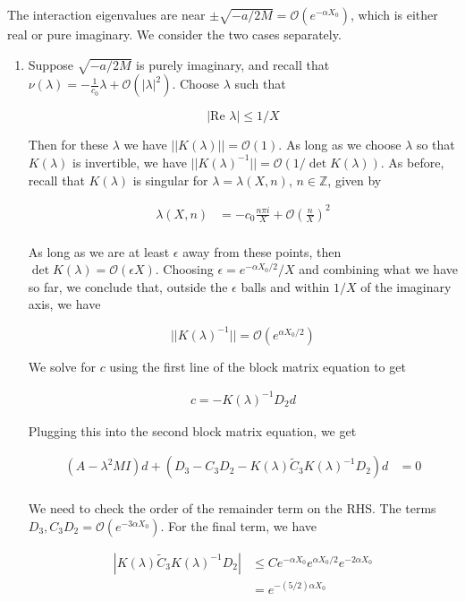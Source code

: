 \documentclass[12pt]{article}
\def\Z{{\mathbb Z}}
\begin{document}
The interaction eigenvalues are near $\pm \sqrt{-a/2M} = \mathcal{O}(e^{-\alpha X_0})$, which is either real or pure imaginary. We consider the two cases separately.

\begin{enumerate}

\item Suppose $\sqrt{-a/2M}$ is purely imaginary, and recall that $\nu(\lambda) = -\frac{1}{c_0}\lambda + \mathcal{O}(|\lambda|^2)$. Choose $\lambda$ such that 


\[
|\text{Re }\lambda| \leq 1/X
\]

Then for these $\lambda$ we have $||K(\lambda)|| = \mathcal{O}(1)$. As long as we choose $\lambda$ so that $K(\lambda)$ is invertible, we have $||K(\lambda)^{-1}|| = \mathcal{O}(1/\det K(\lambda))$. As before, recall that $K(\lambda)$ is singular for $\lambda = \lambda(X, n)$, $n \in \Z$, given by

\begin{align*}
\lambda(X, n)
&= -c_0 \frac{n \pi i }{X} + \mathcal{O}\left( \frac{n}{X}\right)^2 \\
\end{align*}

As long as we are at least $\epsilon$ away from these points, then $\det K(\lambda) = \mathcal{O}(\epsilon X)$. Choosing $\epsilon = e^{-\alpha X_0/2}/X$ and combining what we have so far, we conclude that, outside the $\epsilon$ balls and within $1/X$ of the imaginary axis, we have

\[
||K(\lambda)^{-1}|| = \mathcal{O}(e^{\alpha X_0/2})
\]

We solve for $c$ using the first line of the block matrix equation to get

\begin{align*}
c = -K(\lambda)^{-1} D_2 d
\end{align*}

Plugging this into the second block matrix equation, we get

\begin{align*}
(A - \lambda^2 MI )d + (D_3 - C_3 D_2 - K(\lambda) \tilde{C}_3 K(\lambda)^{-1} D_2) d &= 0 \\
\end{align*}

We need to check the order of the remainder term on the RHS. The terms $D_3, C_3 D_2 = \mathcal{O}(e^{-3 \alpha X_0})$. For the final term, we have

\begin{align*}
|K(\lambda) \tilde{C}_3 K(\lambda)^{-1} D_2| &\leq
C e^{-\alpha X_0} e^{\alpha X_0/2} e^{-2 \alpha X_0} \\
&= e^{-(5/2) \alpha X_0}
\end{align*}


\end{enumerate}
\end{document}
